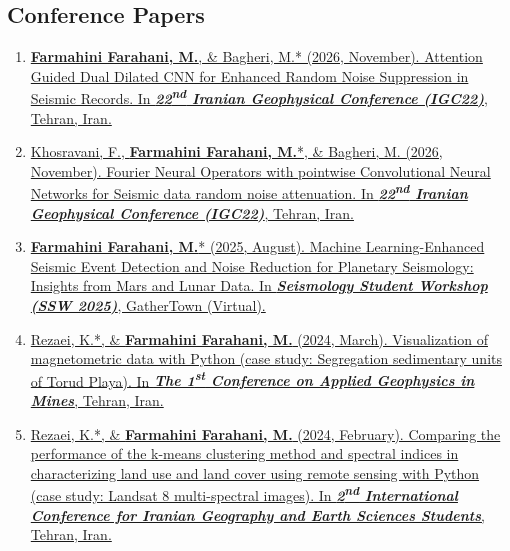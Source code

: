 \documentclass[letterpaper,10pt]{article}
\begin{document}
\begin{justify}
		\subsection*{Conference Papers}
		\begin{enumerate}[label=\arabic*.,left=0pt,topsep=1pt,partopsep=0pt,itemsep=1pt,parsep=0pt]
			\item \href{https://www.researchgate.net/publication/417752034_Attention_Guided_Dual_Dilated_CNN_for_Enhanced_Random_Noise_Suppression_in_Seismic_Records/}{\textbf{Farmahini Farahani, M.}, \& Bagheri, M.* (2026, November). Attention Guided Dual Dilated CNN for Enhanced Random Noise Suppression in Seismic Records. In \textit{\textbf{22\textsuperscript{nd} Iranian Geophysical Conference (IGC22)}}, Tehran, Iran.}
			\item \href{https://www.researchgate.net/publication/417751291_Fourier_Neural_Operators_with_pointwise_Convolutional_Neural_Networks_for_Seismic_data_random_noise_attenuation/}{Khosravani, F., \textbf{Farmahini Farahani, M.}*, \& Bagheri, M. (2026, November). Fourier Neural Operators with pointwise Convolutional Neural Networks for Seismic data random noise attenuation. In \textit{\textbf{22\textsuperscript{nd} Iranian Geophysical Conference (IGC22)}}, Tehran, Iran.}
			\item \href{https://www.researchgate.net/publication/394787112_Machine_Learning-Enhanced_Seismic_Event_Detection_and_Noise_Reduction_for_Planetary_Seismology_Insights_from_Mars_and_Lunar_Data}{\textbf{Farmahini Farahani, M.}* (2025, August). Machine Learning-Enhanced Seismic Event Detection and Noise Reduction for Planetary Seismology: Insights from Mars and Lunar Data. In \textit{\textbf{Seismology Student Workshop (SSW 2025)}}, GatherTown (Virtual).}
			\item \href{https://www.researchgate.net/publication/378739800_Visualization_of_magnetometric_data_with_Python_case_study_Segregation_sedimentary_units_of_Torud_Playa}{Rezaei, K.*, \& \textbf{Farmahini Farahani, M.} (2024, March). Visualization of magnetometric data with Python (case study: Segregation sedimentary units of Torud Playa). In \textit{\textbf{The 1\textsuperscript{st} Conference on Applied Geophysics in Mines}}, Tehran, Iran.}
			\item \href{https://www.researchgate.net/publication/378307658_Comparing_the_performance_of_the_k-means_clustering_method_and_spectral_indices_in_characterizing_land_use_and_land_cover_using_remote_sensing_with_Python_case_study_Landsat_8_multi-spectral_images}{Rezaei, K.*, \& \textbf{Farmahini Farahani, M.} (2024, February). Comparing the performance of the k-means clustering method and spectral indices in characterizing land use and land cover using remote sensing with Python (case study: Landsat 8 multi-spectral images). In \textit{\textbf{2\textsuperscript{nd} International Conference for Iranian Geography and Earth Sciences Students}}, Tehran, Iran.}

\end{enumerate}
\end{justify}
\end{document}
